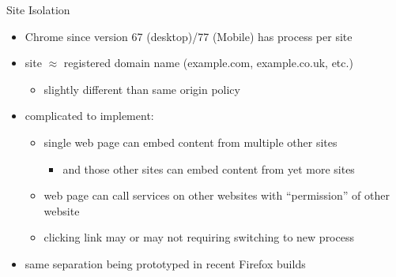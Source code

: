 
\begin{frame}{Site Isolation}
\begin{itemize}
\item Chrome since version 67 (desktop)/77 (Mobile) has process per site
\item site $\approx$ registered domain name (example.com, example.co.uk, etc.)
    \begin{itemize}
    \item slightly different than same origin policy
    \end{itemize}
\vspace{.5cm}
\item complicated to implement:
    \begin{itemize}
    \item single web page can embed content from multiple other sites
        \begin{itemize}
        \item and those other sites can embed content from yet more sites
        \end{itemize}
    \item web page can call services on other websites with ``permission'' of other website
    \item clicking link may or may not requiring switching to new process
    \end{itemize}
\vspace{.5cm}
\item same separation being prototyped in recent Firefox builds
\end{itemize}
\end{frame}
